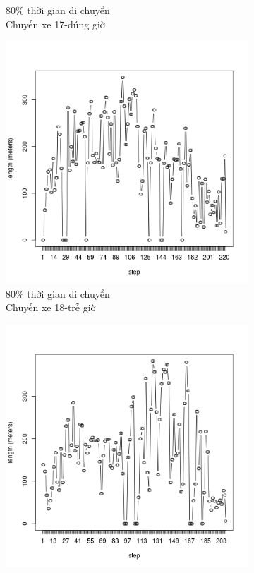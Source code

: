 \documentclass[a4paper, 13pt]{report}
\begin{document}
\begin{figure}
\begin{subfigure}[b]{0.25\textwidth}
                \caption*{80\% thời gian di chuyển\\Chuyến xe 17-đúng giờ}
        \end{subfigure}%
        \begin{subfigure}[b]{0.25\textwidth}
                \includegraphics[width=\linewidth]{test18}
                \caption*{80\% thời gian di chuyển\\Chuyến xe 18-trễ giờ}
        \end{subfigure}%
        \begin{subfigure}[b]{0.25\textwidth}
                \includegraphics[width=\linewidth]{test19}

\end{subfigure}
\end{figure}
\end{document}
